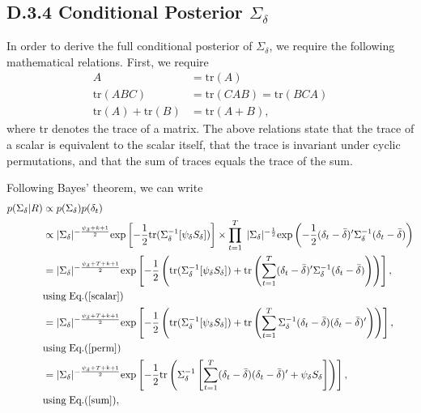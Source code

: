 \subsection*{D.3.4 \hspace{0.1cm} Conditional Posterior $\Sigma_{\delta}$}
In order to derive the full conditional posterior of $\Sigma_{\delta}$, we require the following mathematical relations. First, we require
\begin{align}
\label{scalar}
    A &= \text{tr}(A) \\ 
      \label{perm}
        \text{tr}(ABC) &= \text{tr}(CAB) = \text{tr}(BCA) \\
        \label{sum}
 \text{tr}(A) + \text{tr}(B) &= \text{tr}(A+B),
    \end{align}
    where tr denotes the trace of a matrix. The above relations state that the trace of a scalar is equivalent to the scalar itself, that the trace is invariant under cyclic permutations, and that the sum of traces equals the trace of the sum. 
\par Following Bayes' theorem, we can write 
\begin{alignat}{2}
p(\Sigma_{\delta}|R) &\propto  p(\Sigma_{\delta})p(\delta_t)  \nonumber  \\
 &\propto |\Sigma_{\delta}|^{-\frac{\psi_{\delta} + k + 1}{2}}  \text{exp}\left[-\frac{1}{2}\text{tr}(\Sigma^{-1}_{\delta} [\psi_{\delta}S_{\delta}])\right] \times \prod^{T}_{t=1} \hspace{0.1cm} |\Sigma_{\delta}|^{-\frac{1}{2}}  \text{exp}\left(-\frac{1}{2}(\delta_{t} - \bar{\delta})' \Sigma^{-1}_{\delta}(\delta_{t} - \bar{\delta})\right) \nonumber  \\ 
      &= 
      |\Sigma_{\delta}|^{-\frac{\psi_{\delta} + T + k + 1}{2}} \text{exp}\left[-\frac{1}{2}\left(\text{tr}(\Sigma^{-1}_{\delta} [\psi_{\delta}S_{\delta}]) + \text{tr}\left(\sum^{T}_{t=1}(\delta_{t} - \bar{\delta})' \Sigma^{-1}_{\delta}(\delta_{t} - \bar{\delta}) \right)\right) \right], \   \nonumber  \\ 
      & \text{using} \hspace{0.1cm} \text{Eq.}(\text{\ref{scalar}}) \nonumber \\ 
&= 
      |\Sigma_{\delta}|^{-\frac{\psi_{\delta} + T +k + 1}{2}} \text{exp}\left[-\frac{1}{2}\left(\text{tr}(\Sigma^{-1}_{\delta} [\psi_{\delta}S_{\delta}]) + \text{tr}\left(\sum^{T}_{t=1}\Sigma^{-1}_{\delta}(\delta_{t} - \bar{\delta})(\delta_{t} - \bar{\delta})' \right) \right)\right],  \nonumber  \\ 
         & \text{using} \hspace{0.1cm} \text{Eq.}(\text{\ref{perm}}) \nonumber \\ 
&= 
      |\Sigma_{\delta}|^{-\frac{\psi_{\delta} + T + k + 1}{2}} \text{exp}\left[-\frac{1}{2}\text{tr}\left(\Sigma^{-1}_{\delta} \left[\sum^{T}_{t=1}(\delta_{t} - \bar{\delta}) (\delta_{t} - \bar{\delta})' +  \psi_{\delta}S_{\delta} \right]\right)\right], \nonumber  \\ 
            & \text{using} \hspace{0.1cm} \text{Eq.}(\text{\ref{sum}}),
\end{alignat} 
